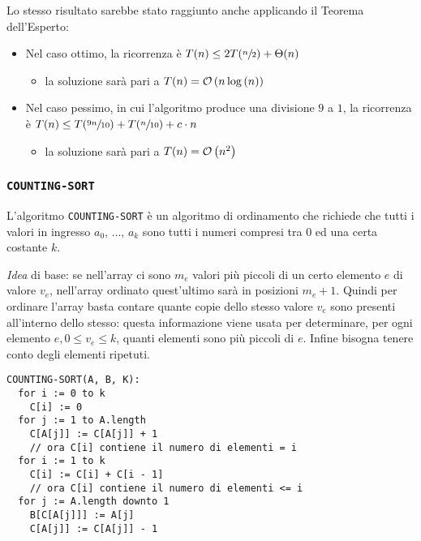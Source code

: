 \documentclass[italian, 10pt]{article}
\begin{document}
\bigskip
Lo stesso risultato sarebbe stato raggiunto anche applicando il Teorema dell'Esperto:

\begin{itemize}
  \item Nel caso ottimo, la ricorrenza è \(T(n) \leq 2T(\sfrac{n}{2}) + \Theta(n)\)
        \begin{itemize}
          \item la soluzione sarà pari a \(T(n) = \mathcal{O}\left(n \log{(n)}\right)\)
        \end{itemize}
  \item Nel caso pessimo, in cui l'algoritmo produce una divisione \(9\) a \(1\), la ricorrenza è \(T(n) \leq T(\sfrac{9n}{10}) + T(\sfrac{n}{10}) + c \cdot n\)
        \begin{itemize}
          \item la soluzione sarà pari a \(T(n) = \mathcal{O}\left(n^2\right)\)
        \end{itemize}
\end{itemize}

\subsubsection{\texttt{COUNTING-SORT}}

L'algoritmo \texttt{COUNTING-SORT} è un algoritmo di ordinamento che richiede che tutti i valori in ingresso \(a_0,\, \ldots,\, a_k\) sono tutti i numeri compresi tra \(0\) ed una certa costante \(k\).

\textit{Idea} di base:
se nell'array ci sono \(m_e\) valori più piccoli di un certo elemento \(e\) di valore \(v_e\), nell'array ordinato quest'ultimo sarà in posizioni \(m_e + 1\).
Quindi per ordinare l'array basta contare quante copie dello stesso valore \(v_e\) sono presenti all'interno dello stesso: questa informazione viene usata per determinare, per ogni elemento \(e, 0 \leq v_e \leq k\), quanti elementi sono più piccoli di \(e\).
Infine bisogna tenere conto degli elementi ripetuti.

\begin{lstlisting}[style=pseudocode, caption={Pseudocodice algorimo \texttt{COUNTING-SORT}}, label={lst:counting-sort}]
COUNTING-SORT(A, B, K):
  for i := 0 to k
    C[i] := 0
  for j := 1 to A.length
    C[A[j]] := C[A[j]] + 1
    // ora C[i] contiene il numero di elementi = i
  for i := 1 to k
    C[i] := C[i] + C[i - 1]
    // ora C[i] contiene il numero di elementi <= i
  for j := A.length downto 1
    B[C[A[j]]] := A[j]
    C[A[j]] := C[A[j]] - 1
\end{lstlisting}
\end{document}
